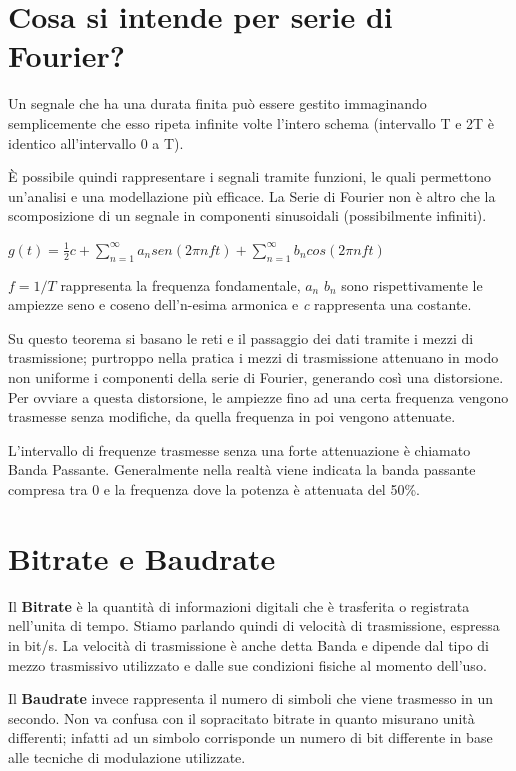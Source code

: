 \section{Cosa si intende per serie di Fourier?}
Un segnale che ha una durata finita può essere gestito immaginando semplicemente che esso ripeta infinite volte l’intero schema (intervallo T e 2T è identico all’intervallo 0 a T).

È possibile quindi rappresentare i segnali tramite funzioni, le quali permettono un’analisi e una modellazione più efficace.
La Serie di Fourier non è altro che la scomposizione di un segnale in componenti sinusoidali (possibilmente infiniti).
\begin{center}
$g(t)=\frac{1}{2}c+\sum_{n=1}^\infty a_n sen(2\pi nft)+\sum_{n=1}^\infty b_n cos(2\pi nft)$ 
\end{center}

$f=1/T$ rappresenta la frequenza fondamentale, $a_n$  $b_n$  sono rispettivamente le ampiezze seno e coseno dell’n-esima armonica e \textit{c} rappresenta una costante.

Su questo teorema si basano le reti e il passaggio dei dati tramite i mezzi di trasmissione; purtroppo nella pratica i mezzi di trasmissione attenuano in modo non uniforme i componenti della serie di Fourier, generando così una distorsione. Per ovviare a questa distorsione, le ampiezze fino ad una certa frequenza vengono trasmesse senza modifiche, da quella frequenza in poi vengono attenuate.

L’intervallo di frequenze trasmesse senza una forte attenuazione è chiamato Banda Passante.
Generalmente nella realtà viene indicata la banda passante compresa tra 0 e la frequenza dove la potenza è attenuata del 50\%.

\section{Bitrate e Baudrate}

Il \textbf{Bitrate} è la quantità di informazioni digitali che è trasferita o registrata nell’unita di tempo.
Stiamo parlando quindi di velocità di trasmissione, espressa in bit/s. La velocità di trasmissione è anche detta Banda e dipende dal tipo di mezzo trasmissivo utilizzato e dalle sue condizioni fisiche al momento dell’uso.

Il \textbf{Baudrate} invece rappresenta il numero di simboli che viene trasmesso in un secondo. Non va confusa con il sopracitato bitrate in quanto misurano unità differenti; infatti ad un simbolo corrisponde un numero di bit differente in base alle tecniche di modulazione utilizzate.

